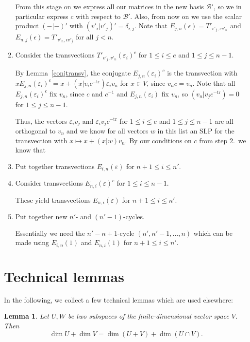 \documentclass[a4paper,11pt]{article}
\newcommand{\tr}{\mathrm{tr}}
\newcommand{\B}{\mathcal{B}}
\newtheorem{lemma}{Lemma}
\begin{document}
\begin{enumerate}
From this stage on we express all our matrices in the new basis $\B'$,
so we in particular express $c$ with respect to $\B'$.
Also, from now on we use the scalar product $(-|-)'$ with 
$(v'_i|v'_j)' = \delta_{i,j}$. Note that $E_{j,n}(\epsilon) =
T'_{v'_j,\epsilon v'_n}$ and $E_{n,j}(\epsilon) = T'_{v'_n,\epsilon
v'_j}$ for all $j < n$.

\item Consider the transvections $T'_{v'_j,v'_n}(\varepsilon_i)^c$ 
for $1 \le i \le e$ and $1 \le j \le n-1$.

By Lemma~\ref{conjtransv}, 
the conjugate $E_{j,n}(\varepsilon_i)^c$ is the transvection
with $xE_{j,n}(\varepsilon_i)^c = x + (x|v_ic^{-\tr})\varepsilon_i v_n$ 
for $x \in V$, since $v_nc = v_n$. Note that all
$E_{j,n}(\varepsilon_i)^c$ fix $v_n$, since $c$ and $c^{-1}$ and
$E_{j,n}(\varepsilon_i)$ fix $v_n$, so $(v_n|v_jc^{-\tr}) = 0$ for $1 \le
j \le n-1$.

Thus, the vectors $\varepsilon_i v_j$ and $\varepsilon_i v_j c^{-\tr}$
for $1 \le i \le e$ and $1 \le j \le n-1$
are all orthogonal to $v_n$ and we know for all 
vectors $w$ in this list an SLP for the transvection with
$x \mapsto x + (x|w)v_n$. By our conditions on $c$ from step 2.~we know
that 

\item Put together transvections $E_{i,n}(\varepsilon)$ for $n+1 \le i \le n'$.
\item Consider transvections $E_{n,i}(\varepsilon)^c$ for $1 \le i \le n-1$.

These yield transvections $E_{n,i}(\varepsilon)$ for $n+1 \le i \le n'$.

\item Put together new $n'$- and $(n'-1)$-cycles.

Essentially we need the $n'-n+1$-cycle $(n',n'-1, \ldots, n)$ which can 
be made using $E_{i,n}(1)$ and $E_{n,i}(1)$ for $n+1 \le i \le n'$.
\end{enumerate}

\section{Technical lemmas}

In the following, we collect a few technical lemmas which are used
elsewhere:

\begin{lemma}
\label{dimformula}
Let $U,W$ be two subspaces of the finite-dimensional vector space $V$.
Then
\[ \dim U + \dim V = \dim(U+V) + \dim(U \cap V). \]
\end{lemma}
\end{document}
